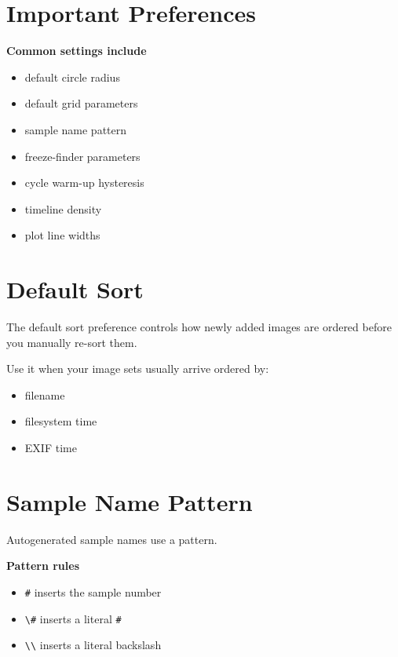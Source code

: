 \documentclass[
  9pt,
  letterpaper,
  oneside,
  open=any,
  DIV=15,
  parskip=half-,
  headings=big,
  numbers=noenddot
]{scrbook}
\newcommand{\manuallead}[1]{%
  \vspace{0.15em}%
  {\sffamily\bfseries\color{ManualBlue}#1}\par\nobreak\vspace{0.05em}%
}
\begin{document}
\section{Important Preferences}

\manuallead{Common settings include}

\begin{itemize}[leftmargin=*,itemsep=0.35em,topsep=0.4em]
\item default circle radius
\item default grid parameters
\item sample name pattern
\item freeze-finder parameters
\item cycle warm-up hysteresis
\item timeline density
\item plot line widths
\end{itemize}

\section{Default Sort}

The default sort preference controls how newly added images are ordered before you manually re-sort them.


Use it when your image sets usually arrive ordered by:


\begin{itemize}[leftmargin=*,itemsep=0.35em,topsep=0.4em]
\item filename
\item filesystem time
\item EXIF time
\end{itemize}

\section{Sample Name Pattern}

Autogenerated sample names use a pattern.


\manuallead{Pattern rules}

\begin{itemize}[leftmargin=*,itemsep=0.35em,topsep=0.4em]
\item \texttt{\#} inserts the sample number
\item \texttt{\textbackslash{}\#} inserts a literal \texttt{\#}
\item \texttt{\textbackslash{}\textbackslash{}} inserts a literal backslash
\end{itemize}
\end{document}
